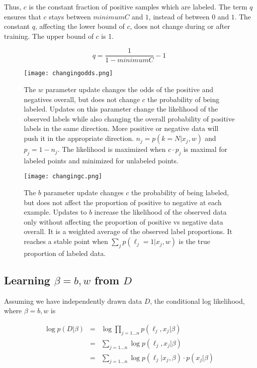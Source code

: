 \documentclass{article}
\begin{document}
Thus, $c$ is the constant fraction of positive samples which are labeled. The term $q$ ensures that $c$ stays between $minimumC$ and $1$, instead of  between $0$ and $1$.  The constant $q$, affecting the lower bound of $c$, does not change during or after training. The upper bound of $c$ is 1.

$$q = \frac{1}{1 - minimumC} - 1$$

\begin{figure}[ht!]
\vskip 0.2in
\begin{center}
\centerline{\texttt{[image: changingodds.png]}}
\caption{The $w$ parameter update changes the odds of the positive and negatives overall, but does not change $c$ the probability of being labeled. Updates on this parameter change the likelihood of the observed labels while also changing the overall probability of positive labels in the same direction. More positive or negative data will push it in the appropriate direction. $n_j = p(k=N|x_j,w)$ and $p_j = 1-n_j$. The likelihood is maximized when $c \cdot p_{j}$ is maximal for labeled points and minimized for unlabeled points. }
\label{changingodds}
\end{center}
\vskip -0.2in
\end{figure}

\begin{figure}[ht!]
\vskip 0.2in
\begin{center}
\centerline{\texttt{[image: changingc.png]}}
\caption{The $b$ parameter update changes $c$ the probability of being labeled, but does not affect the proportion of positive to negative at each example. Updates to $b$ increase the likelihood of the observed data only without affecting the proportion of positive vs negative data overall. It is a weighted average of the observed label proportions.  It reaches a stable point when $\sum_{j}{p(\ell_j=1|x_j,w)}$ is the true proportion of labeled data.}
\label{changingc}
\end{center}
\vskip -0.2in
\end{figure}

\subsection{Learning $\beta = b, w$ from $D$}

Assuming we have independently drawn data $D$, the conditional log likelihood, where $\beta = b, w$ is \cite{carpenter08}

\begin{eqnarray*}
\log{p(D | \beta)} &=& \log \prod_{j=1...n}{p(\ell_j, x_j | \beta)} \\
 &=& \sum_{j=1...n}{\log{p(\ell_j, x_j | \beta)}} \\
 &=& \sum_{j=1...n}{\log{p(\ell_j | x_j, \beta)}} \cdot p(x_j | \beta)
\end{eqnarray*}
\end{document}
